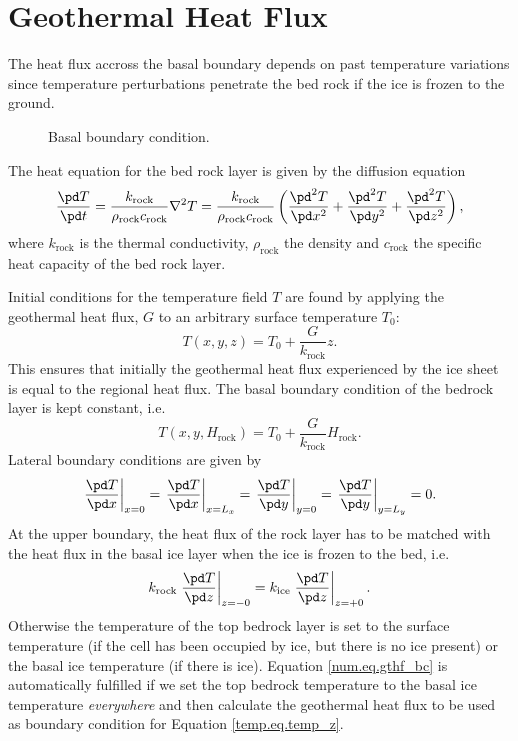 \section{Geothermal Heat Flux}
The heat flux accross the basal boundary depends on past temperature variations since temperature perturbations penetrate the bed rock if the ice is frozen to the ground. 

\begin{figure}[htbp]
  \centering
  \caption{Basal boundary condition.}
  \label{num.fig.basal_bc}
\end{figure}

The heat equation for the bed rock layer is given by the diffusion equation
\begin{equation}
  \label{num.eq.diffu_rock}
  \frac{\pd T}{\pd t} = \frac{k_{\text{rock}}}{\rho_{\text{rock}}c_{\text{rock}}}\nabla^2T=\frac{k_{\text{rock}}}{\rho_{\text{rock}}c_{\text{rock}}} 
  \left(\frac{\pd^2 T}{\pd x^2}+\frac{\pd^2 T}{\pd y^2}+\frac{\pd^2 T}{\pd z^2}\right),
\end{equation}
where $k_{\text{rock}}$ is the thermal conductivity, $\rho_{\text{rock}}$ the density and $c_{\text{rock}}$ the specific heat capacity of the bed rock layer. 

Initial conditions for the temperature field $T$ are found by applying the geothermal heat flux, $G$ to an arbitrary surface temperature $T_0$:
\begin{equation}
  T(x,y,z)=T_0+\frac{G}{k_{\text{rock}}}z.
\end{equation}
This ensures that initially the geothermal heat flux experienced by the ice sheet is equal to the regional heat flux. The basal boundary condition of the bedrock layer is kept constant, i.e.
\begin{equation}
  T(x,y,H_{\text{rock}})=T_0+\frac{G}{k_{\text{rock}}}H_{\text{rock}}.
\end{equation}
Lateral boundary conditions are given by
\begin{equation}
  \left.\frac{\pd T}{\pd x}\right|_{x=0} = \left.\frac{\pd T}{\pd x}\right|_{x=L_x} = \left.\frac{\pd T}{\pd y}\right|_{y=0} = \left.\frac{\pd T}{\pd y}\right|_{y=L_y} = 0.
\end{equation}
At the upper boundary, the heat flux of the rock layer has to be matched with the heat flux in the basal ice layer when the ice is frozen to the bed, i.e.
\begin{equation}
  \label{num.eq.gthf_bc}
  k_{\text{rock}}\left.\frac{\pd T}{\pd z}\right|_{z=-0}=k_{\text{ice}}\left.\frac{\pd T}{\pd z}\right|_{z=+0}.
\end{equation}
Otherwise the temperature of the top bedrock layer is set to the surface temperature (if the cell has been occupied by ice, but there is no ice present) or the basal ice temperature (if there is ice). Equation \eqref{num.eq.gthf_bc} is automatically fulfilled if we set the top bedrock temperature to the basal ice temperature \emph{everywhere} and then calculate the geothermal heat flux to be used as boundary condition for Equation \eqref{temp.eq.temp_z}.



